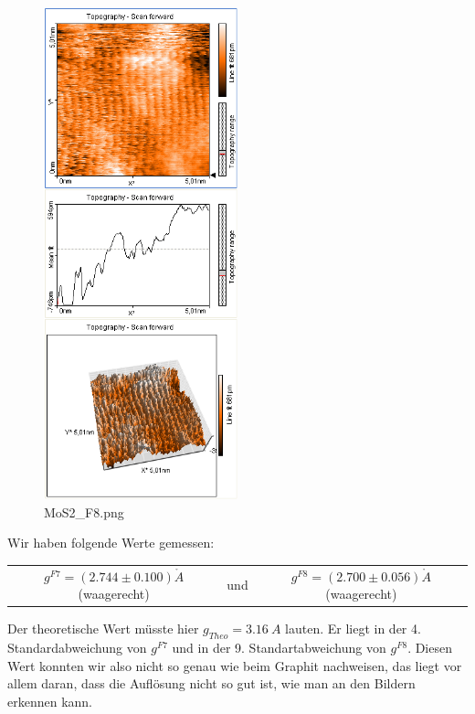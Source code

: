 \begin{figure}[H]
	\centering \includegraphics*[viewport= 5 528 322 825 , width = 0.5\textwidth]{messwerte/Freitag/MoS2_F8.png}
	\caption{MoS2\_F8.png}
	\end{figure}
	
Wir haben folgende Werte gemessen:

\begin{tabular}{c c c}
	$g^{F7} = (2.744 \pm 0.100) \mathring{A}$ (waagerecht) & und & $g^{F8} = (2.700 \pm 0.056) \mathring{A}$ (waagerecht)
\end{tabular}	
	
Der theoretische Wert müsste hier $g_{Theo} = 3.16 \mathring\ A$ lauten. Er liegt in der 4. Standardabweichung von $g^{F7}$ und in der 9. Standartabweichung von $g^{F8}$. Diesen Wert konnten wir also nicht so genau wie beim Graphit nachweisen, das liegt vor allem daran, dass die Auflösung nicht so gut ist, wie man an den Bildern erkennen kann.
	
	
	
	
	
	
	
